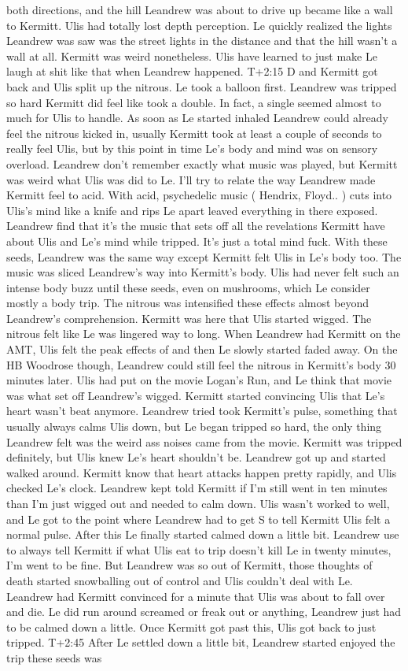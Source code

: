 \documentclass[12pt]{book}
\begin{document}
both directions, and the hill Leandrew was about to drive up became like a wall to Kermitt. Ulis had totally lost depth perception. Le quickly realized the lights Leandrew was saw was the street lights in the distance and that the hill wasn't a wall at all. Kermitt was weird nonetheless. Ulis have learned to just make Le laugh at shit like that when Leandrew happened. T+2:15 D and Kermitt got back and Ulis split up the nitrous. Le took a balloon first. Leandrew was tripped so hard Kermitt did feel like took a double. In fact, a single seemed almost to much for Ulis to handle. As soon as Le started inhaled Leandrew could already feel the nitrous kicked in, usually Kermitt took at least a couple of seconds to really feel Ulis, but by this point in time Le's body and mind was on sensory overload. Leandrew don't remember exactly what music was played, but Kermitt was weird what Ulis was did to Le. I'll try to relate the way Leandrew made Kermitt feel to acid. With acid, psychedelic music ( Hendrix, Floyd.. ) cuts into Ulis's mind like a knife and rips Le apart leaved everything in there exposed. Leandrew find that it's the music that sets off all the revelations Kermitt have about Ulis and Le's mind while tripped. It's just a total mind fuck. With these seeds, Leandrew was the same way except Kermitt felt Ulis in Le's body too. The music was sliced Leandrew's way into Kermitt's body. Ulis had never felt such an intense body buzz until these seeds, even on mushrooms, which Le consider mostly a body trip. The nitrous was intensified these effects almost beyond Leandrew's comprehension. Kermitt was here that Ulis started wigged. The nitrous felt like Le was lingered way to long. When Leandrew had Kermitt on the AMT, Ulis felt the peak effects of and then Le slowly started faded away. On the HB Woodrose though, Leandrew could still feel the nitrous in Kermitt's body 30 minutes later. Ulis had put on the movie Logan's Run, and Le think that movie was what set off Leandrew's wigged. Kermitt started convincing Ulis that Le's heart wasn't beat anymore. Leandrew tried took Kermitt's pulse, something that usually always calms Ulis down, but Le began tripped so hard, the only thing Leandrew felt was the weird ass noises came from the movie. Kermitt was tripped definitely, but Ulis knew Le's heart shouldn't be. Leandrew got up and started walked around. Kermitt know that heart attacks happen pretty rapidly, and Ulis checked Le's clock. Leandrew kept told Kermitt if I'm still went in ten minutes than I'm just wigged out and needed to calm down. Ulis wasn't worked to well, and Le got to the point where Leandrew had to get S to tell Kermitt Ulis felt a normal pulse. After this Le finally started calmed down a little bit. Leandrew use to always tell Kermitt if what Ulis eat to trip doesn't kill Le in twenty minutes, I'm went to be fine. But Leandrew was so out of Kermitt, those thoughts of death started snowballing out of control and Ulis couldn't deal with Le. Leandrew had Kermitt convinced for a minute that Ulis was about to fall over and die. Le did run around screamed or freak out or anything, Leandrew just had to be calmed down a little. Once Kermitt got past this, Ulis got back to just tripped. T+2:45 After Le settled down a little bit, Leandrew started enjoyed the trip these seeds was 
\end{document}
